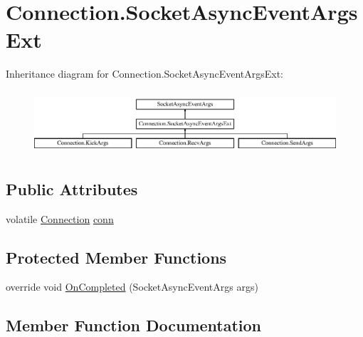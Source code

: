 \hypertarget{classOTA_1_1Sockets_1_1Connection_1_1SocketAsyncEventArgsExt}{}\section{Connection.\+Socket\+Async\+Event\+Args\+Ext}
\label{classOTA_1_1Sockets_1_1Connection_1_1SocketAsyncEventArgsExt}
Inheritance diagram for Connection.\+Socket\+Async\+Event\+Args\+Ext\+:\begin{figure}[H]
\begin{center}
\leavevmode
\includegraphics[height=2.352941cm]{classOTA_1_1Sockets_1_1Connection_1_1SocketAsyncEventArgsExt}
\end{center}
\end{figure}
\subsection*{Public Attributes}
\begin{DoxyCompactItemize}
\item 
volatile \hyperlink{classOTA_1_1Sockets_1_1Connection}{Connection} \hyperlink{classOTA_1_1Sockets_1_1Connection_1_1SocketAsyncEventArgsExt_acfdf4a7c41f0650573481d6de189dcba}{conn}
\end{DoxyCompactItemize}
\subsection*{Protected Member Functions}
\begin{DoxyCompactItemize}
\item 
override void \hyperlink{classOTA_1_1Sockets_1_1Connection_1_1SocketAsyncEventArgsExt_a9271e966175743bc7a672a013258a6cf}{On\+Completed} (Socket\+Async\+Event\+Args args)
\end{DoxyCompactItemize}


\subsection{Member Function Documentation}
\hypertarget{classOTA_1_1Sockets_1_1Connection_1_1SocketAsyncEventArgsExt_a9271e966175743bc7a672a013258a6cf}{}
